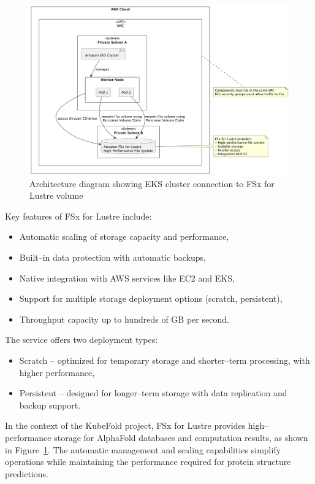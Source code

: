 \begin{figure}[htbp]
    \centering
    \includegraphics[width=\textwidth]{images/fsx}
    \caption{Architecture diagram showing EKS cluster connection to FSx for Lustre volume}
    \label{fig:fsx-architecture}
\end{figure}

Key features of FSx for Lustre include:
\begin{itemize}
    \item Automatic scaling of storage capacity and performance,
    \item Built--in data protection with automatic backups,
    \item Native integration with AWS services like EC2 and EKS,
    \item Support for multiple storage deployment options (scratch, persistent),
    \item Throughput capacity up to hundreds of GB per second.
\end{itemize}

The service offers two deployment types:
\begin{itemize}
    \item Scratch -- optimized for temporary storage and shorter--term processing, with higher performance,
    \item Persistent -- designed for longer--term storage with data replication and backup support.
\end{itemize}

In the context of the KubeFold project, FSx for Lustre provides high--performance storage for AlphaFold databases and computation results, as shown in Figure~\ref{fig:fsx-architecture}.
The automatic management and scaling capabilities simplify operations while maintaining the performance required for protein structure predictions.

